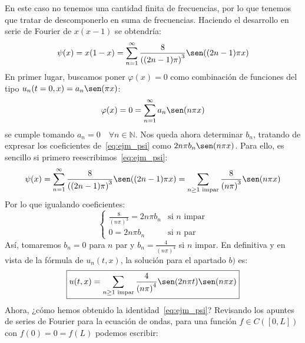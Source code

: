 \begin{ejemplo}
\begin{enumerate}[label=\alph*)]
            En este caso no tenemos una cantidad finita de frecuencias, por lo que tenemos que tratar de descomponerlo en suma de frecuencias. Haciendo el desarrollo en serie de Fourier de $x(x-1)$ se obtendría:
            \begin{equation}\label{eq:ejm_psi}
                \psi(x) = x(1-x) = \sum_{n=1}^{\infty} \frac{8}{{((2n-1)\pi)}^{3}}\sen((2n-1)\pi x)
            \end{equation}
            En primer lugar, buscamos poner $\varphi(x)=0$ como combinación de funciones del tipo $u_n(t=0,x) = a_n\sen(\pi x)$:
            \begin{equation*}
                \varphi(x) = 0 = \sum_{n=1}^{\infty}a_n \sen(n\pi x)
            \end{equation*}
            se cumple tomando $a_n = 0 \quad \forall n\in \mathbb{N}$. Nos queda ahora determinar $b_n$, tratando de expresar los coeficientes de~\eqref{eq:ejm_psi} como $2n\pi b_n\sen(n\pi x)$. Para ello, es sencillo si primero reescribimos~\eqref{eq:ejm_psi}:
            \begin{equation*}
                \psi(x) = \sum_{n=1}^{\infty} \frac{8}{{((2n-1)\pi)}^{3}}\sen((2n-1)\pi x) = \sum_{n\geq 1 \text{\ impar}} \frac{8}{{(n\pi)}^{3}}\sen(n\pi x)
            \end{equation*}
            Por lo que igualando coeficientes:
            \begin{equation*}
                \left\{\begin{array}{ll}
                     \frac{8}{{(n\pi)}^{3}} = 2n\pi b_n & \text{si\ } n \text{\ impar} \\
                     0 = 2n\pi b_n & \text{si\ } n \text{\ par} 
                \end{array}\right. 
            \end{equation*}
            Así, tomaremos $b_n = 0$ para $n$ par y $b_n = \frac{4}{{(n\pi)}^{4}}$ si $n$ impar. En definitiva y en vista de la fórmula de $u_n(t,x)$, la solución para el apartado $b)$ es:
            \begin{equation*}
                \boxed{u(t,x) = \sum_{n\geq 1 \text{\ impar}} \frac{4}{{(n\pi)}^{4}} \sen(2n\pi t)\sen(n\pi x)}
            \end{equation*}
            Ahora, ¿cómo hemos obtenido la identidad~\eqref{eq:ejm_psi}? Revisando los apuntes de series de Fourier para la ecuación de ondas, para una función $f\in C([0,L])$ con $f(0) = 0 = f(L)$ podemos escribir:
            \begin{equation*}

\end{equation*}
\end{enumerate}
\end{ejemplo}
